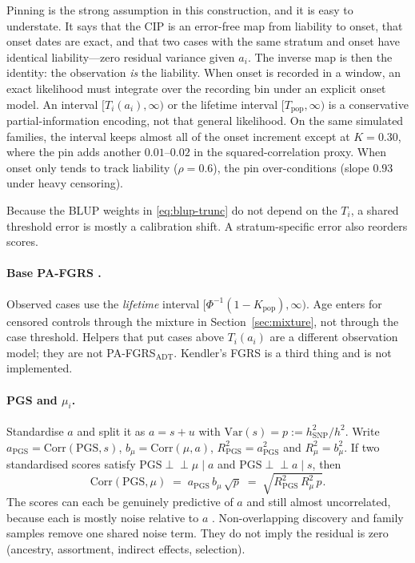 \documentclass[11pt,a4paper]{article}
\newcommand{\Var}{\mathrm{Var}}
\newcommand{\Corr}{\mathrm{Corr}}
\newcommand{\h}{h^{2}}
\newcommand{\ind}{\perp\!\!\!\perp}
\begin{document}
Pinning is the strong assumption in this construction, and it is
easy to understate.
It says that the CIP is an error-free map from liability to onset,
that onset dates are exact, and that two cases with the same
stratum and onset have identical liability---zero residual variance
given $a_i$.
The inverse map is then the identity: the observation \emph{is}
the liability.
When onset is recorded in a window, an exact likelihood must integrate
over the recording bin under an explicit onset model. An interval
$[T_i(a_i),\infty)$ or the lifetime interval $[T_{\mathrm{pop}},\infty)$
is a conservative partial-information encoding, not that general
likelihood.
On the same simulated families, the interval keeps almost all of
the onset increment except at $K=0.30$, where the pin adds another
$0.01$--$0.02$ in the squared-correlation proxy.
When onset only tends to track liability ($\rho=0.6$), the pin
over-conditions (slope $0.93$ under heavy censoring).

Because the BLUP weights in \eqref{eq:blup-trunc} do not depend on
the $T_i$, a shared threshold error is mostly a calibration shift.
A stratum-specific error also reorders scores.

\paragraph{Base PA-FGRS \cite{krebs2024}.}
Observed cases use the \emph{lifetime} interval
$[\Phi^{-1}(1-K_{\mathrm{pop}}),\infty)$.
Age enters for censored controls through the mixture in
Section~\ref{sec:mixture}, not through the case threshold.
Helpers that put cases above $T_i(a_i)$ are a different observation
model; they are not PA-FGRS$_{\mathrm{ADT}}$.
Kendler's FGRS \cite{kendler2021} is a third thing and is not
implemented.

\paragraph{PGS and $\mu_i$.}
Standardise $a$ and split it as $a=s+u$ with $\Var(s)=p:=\h_{\mathrm{SNP}}/\h$.
Write $a_{\mathrm{PGS}}=\Corr(\mathrm{PGS},s)$, $b_\mu=\Corr(\mu,a)$,
$R^{2}_{\mathrm{PGS}}=a_{\mathrm{PGS}}^{2}$ and $R^{2}_{\mu}=b_\mu^{2}$.
If two standardised scores satisfy
$\mathrm{PGS}\ind\mu\mid a$ and $\mathrm{PGS}\ind a\mid s$, then
\begin{equation}
  \Corr(\mathrm{PGS},\mu)
  \;=\;
  a_{\mathrm{PGS}}\,b_{\mu}\,\sqrt{p}
  \;=\;
  \sqrt{R^{2}_{\mathrm{PGS}}\,R^{2}_{\mu}\,p}.
  \label{eq:pgs-fh}
\end{equation}
The scores can each be genuinely predictive of $a$ and still almost
uncorrelated, because each is mostly noise relative to $a$
\cite{hujoel2022,krebs2026}.
Non-overlapping discovery and family samples remove one shared
noise term.
They do not imply the residual is zero (ancestry, assortment,
indirect effects, selection).
\end{document}
